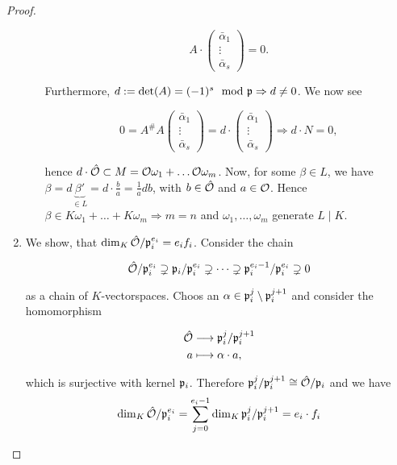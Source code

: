\begin{proof}
\begin{enumerate}[Step 1:]
\begin{enumerate}[(1)]
			 \[
			 A \cdot
			 \begin{pmatrix}
			 	\bar\alpha_1 \\
			 	\vdots \\
			 	\bar\alpha_s
			 \end{pmatrix}
			 = 0.	 
			 \]
			 
			 Furthermore, $d:=\det(A) = (-1)^s \mod {\mathfrak{p}} \Rightarrow d \neq 0$. We now see
			 
			 \[
			 0 = A^\#A
			 \begin{pmatrix}
			 \bar\alpha_1 \\
			 \vdots \\
			 \bar\alpha_s
			 \end{pmatrix}	 
			 = d \cdot
			 \begin{pmatrix}
			 \bar\alpha_1 \\
			 \vdots \\
			 \bar\alpha_s
			 \end{pmatrix}		 
			 \Longrightarrow d \cdot N = 0,
			 \]
			 
			 hence $d \cdot \hat{\mathcal{O}} \subset M = \mathcal{O}\omega_1 + \dots \mathcal{O}\omega_m$.
			 Now, for some $\beta \in L$, we have $\beta = d\underbrace{\beta'}_{\in L} = d \cdot \frac{b}{a} = \frac{1}{a}db$, with $b \in \hat{\mathcal{O}}$ and $a \in \mathcal{O}$. Hence $\beta \in K\omega_1 + \dots + K\omega_m \Rightarrow m = n$ and $\omega_1, \dots, \omega_m$ generate $L \mid K$.			 
		\end{enumerate}
		
		\bigskip
		
		 \item We show, that $\dim_K \hat{\mathcal{O}}/\mathfrak{p}_i^{e_i} = e_if_i$. Consider the chain
		 
		 \[
		 \hat{\mathcal{O}}/\mathfrak{p}_i^{e_i} \supsetneq \mathfrak{p}_i/\mathfrak{p}_i^{e_i} \supsetneq \dots \supsetneq \mathfrak{p}_i^{e_i-1}/\mathfrak{p}_i^{e_i} \supsetneq 0
		  \]
		  
		  as a chain of $K$-vectorspaces. Choos an $\alpha \in \mathfrak{p}_i^j \setminus \mathfrak{p}_i^{j+1}$ and consider the homomorphism
		  
		  \[
		  \begin{aligned}
		   \hat{\mathcal{O}} &\longrightarrow \mathfrak{p}_i^j/\mathfrak{p}_i^{j+1} \\
		   a &\longmapsto \alpha \cdot a,
		   \end{aligned}
		   \]
		   
		  which is surjective with kernel $\mathfrak{p}_i$. Therefore $\mathfrak{p}_i^j / \mathfrak{p}_i^{j+1} \cong \hat{\mathcal{O}} / \mathfrak{p}_i$ and we have
		  \[  \dim_K \hat{\mathcal{O}}/\mathfrak{p}_i^{e_i} = \sum_{j=0}^{e_i-1} \dim_K \mathfrak{p}_i^j / \mathfrak{p}_i^{j+1} = e_i \cdot f_i  \]	   	
	\end{enumerate}
\end{proof}
